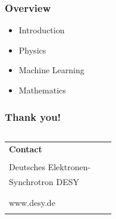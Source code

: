 \begin{frame}
\frametitle{Overview}
  \begin{itemize}[<+->]
      \item {Introduction}
      \item {Physics}
      \item {Machine Learning}
      \item {Mathematics}
  \end{itemize}
\end{frame}



\begin{frame}
\frametitle{Thank you!}
\vfill{}
\vspace*{3.5cm}


\fontsize{8}{9}\selectfont
\begin{columns}
	\hspace*{-0.8em}
	\hspace*{-1em}  %
	\begin{column}{\textwidth}
		\begin{tabular}{lll}
		\textbf{Contact}&\hspace*{0.5cm} & \\
						&\hspace*{0.5cm} & \\
		\hspace*{-0.4mm}Deutsches Elektronen-&\hspace*{0.5cm} & \AUTHOR\\
		\hspace*{-0.4mm}Synchrotron DESY&\hspace*{0.5cm} & \ORCiD{\ORCID}\\
							&\hspace*{0.5cm} & \GROUP\\
							&\hspace*{0.5cm} & \MailTo{\EMAIL}\\
		\hspace*{-0.4mm}www.desy.de			&\hspace*{0.5cm} & \PHONE\\
							&\hspace*{0.5cm} & \DOIlink{\DOI}\\
		\end{tabular}
	\end{column}
\end{columns}


\end{frame}


